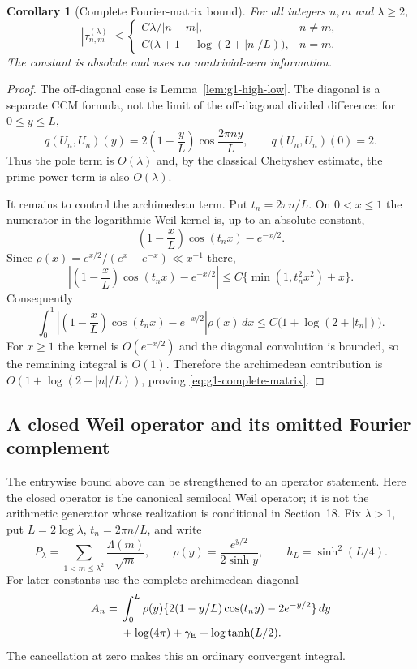 \documentclass[11pt]{article}
\newtheorem{corollary}[theorem]{Corollary}
\theoremstyle{remark}
\begin{document}
\begin{corollary}[Complete Fourier-matrix bound]\label{cor:g1-complete-matrix}
For all integers $n,m$ and $\lambda\ge2$,
\begin{equation}\label{eq:g1-complete-matrix}
 \boxed{
 |\tau^{(\lambda)}_{n,m}|
 \le
 \begin{cases}
 C\lambda/|n-m|,&n\ne m,\\[2mm]
 C\bigl(\lambda+1+\log(2+|n|/L)\bigr),&n=m.
 \end{cases}}
\end{equation}
The constant is absolute and uses no nontrivial-zero information.
\end{corollary}
\begin{proof}
The off-diagonal case is Lemma~\ref{lem:g1-high-low}.  The diagonal is a
separate CCM formula, not the limit of the off-diagonal divided difference:
for $0\le y\le L$,
\[
 q(U_n,U_n)(y)=2\left(1-\frac yL\right)
 \cos\frac{2\pi ny}{L},
 \qquad q(U_n,U_n)(0)=2.
\]
Thus the pole term is $O(\lambda)$ and, by the classical Chebyshev estimate,
the prime-power term is also $O(\lambda)$.

It remains to control the archimedean term.  Put $t_n=2\pi n/L$.  On
$0<x\le1$ the numerator in the logarithmic Weil kernel is, up to an absolute
constant,
\[
 \left(1-\frac xL\right)\cos(t_nx)-e^{-x/2}.
\]
Since $\rho(x)=e^{x/2}/(e^x-e^{-x})\ll x^{-1}$ there,
\[
 \left|\left(1-\frac xL\right)\cos(t_nx)-e^{-x/2}\right|
 \le C\{\min(1,t_n^2x^2)+x\}.
\]
Consequently
\[
 \int_0^1
 \left|\left(1-\frac xL\right)\cos(t_nx)-e^{-x/2}\right|
 \rho(x)\,dx
 \le C\bigl(1+\log(2+|t_n|)\bigr).
\]
For $x\ge1$ the kernel is $O(e^{-x/2})$ and the diagonal convolution is
bounded, so the remaining integral is $O(1)$.  Therefore the archimedean
contribution is
$O(1+\log(2+|n|/L))$, proving \eqref{eq:g1-complete-matrix}.
\end{proof}

\subsection*{A closed Weil operator and its omitted Fourier complement}
The entrywise bound above can be strengthened to an operator statement.
Here the closed operator is the canonical semilocal Weil operator; it is
not the arithmetic generator whose realization is conditional in Section~18.
Fix $\lambda>1$, put $L=2\log\lambda$, $t_n=2\pi n/L$, and write
\[
 P_\lambda=\sum_{1<m\le\lambda^2}\frac{\Lambda(m)}{\sqrt m},
 \qquad \rho(y)=\frac{e^{y/2}}{2\sinh y},
 \qquad h_L=\sinh^2(L/4).
\]
For later constants use the complete archimedean diagonal
\begin{align}
 A_n={}&\int_0^L\rho(y)
 \{2(1-y/L)\cos(t_ny)-2e^{-y/2}\}\,dy \notag\\
 &+\log(4\pi)+\gamma_{\rm E}+\log\tanh(L/2).
 \label{eq:v114-arch-diagonal}
\end{align}
The cancellation at zero makes this an ordinary convergent integral.
\end{document}
